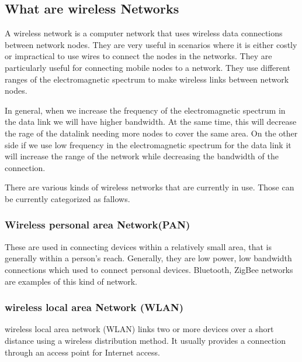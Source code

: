 \subsection{What are wireless Networks}
\vspace{12pt}

A wireless network is a computer network that uses wireless data connections between network nodes. They are very useful in scenarios where it is either costly or impractical to use wires to connect the nodes in the networks. They are particularly useful for connecting mobile nodes to a network. They use different ranges of the electromagnetic spectrum to make wireless links between network nodes.

\vspace{12pt}

In general, when we increase the frequency of the electromagnetic spectrum in the data link we will have higher bandwidth. At the same time, this will decrease the rage of the datalink needing more nodes to cover the same area. On the other side if we use low frequency in the electromagnetic spectrum for the data link it will increase the range of the network while decreasing the bandwidth of the connection.

\vspace{12pt}

There are various kinds of wireless networks that are currently in use. Those can be currently categorized as fallows. 


\vspace{12pt}
\clearpage
\subsubsection{Wireless personal area Network(PAN)}


\vspace{12pt}

 These are used in connecting devices within a relatively small area, that is generally within a person's reach. Generally, they are low power, low bandwidth connections which used to connect personal devices. Bluetooth, ZigBee networks are examples of this kind of network.

 \vspace{12pt}
 
  \subsubsection*{wireless local area Network (WLAN)}
  \vspace{12pt}
  wireless local area network (WLAN) links two or more devices over a short distance using a wireless distribution method. It usually provides a connection through an access point for Internet access. 
  
